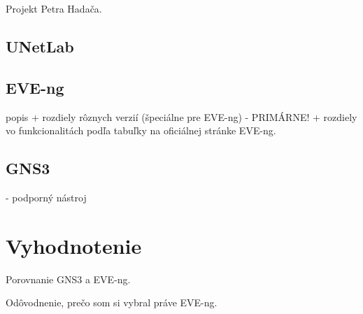 Projekt Petra Hadača.

\subsection{UNetLab}

\subsection{EVE-ng}

popis + rozdiely rôznych verzií (špeciálne pre EVE-ng) - PRIMÁRNE! + rozdiely vo funkcionalitách podľa tabuľky na oficiálnej stránke EVE-ng.

\subsection{GNS3}

- podporný nástroj

\section{Vyhodnotenie}

Porovnanie GNS3 a EVE-ng.

Odôvodnenie, prečo som si vybral práve EVE-ng.